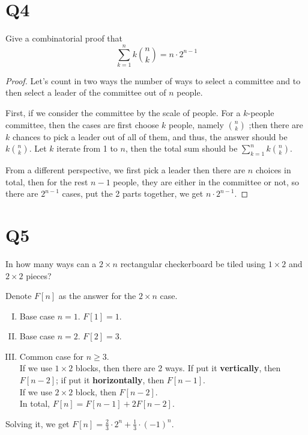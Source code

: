 \documentclass[11pt]{article}
\begin{document}
\section*{Q4}
Give a combinatorial proof that
\begin{equation*}
  \sum_{k=1}^{n }k\binom{n }{k}=n\cdot 2^{n-1}
\end{equation*}
\begin{proof}
    Let's count in two ways the number of ways to select a
committee and to then select a leader of the committee out of $n$ people.

First, if we consider the committee by the scale of people. For a $k$-people
committee, then the cases are first choose $k$ people, namely $\binom{n }{k}$
;then there are $k$ chances to pick a leader out of all of them, and thus, 
the answer should be $k\binom{n }{k}$. Let $k$ iterate from 1 to $n$, then the total sum should be $\sum_{k=1}^{n }k\binom{n }{k}$.

From a different perspective, we first pick a leader then there are $n$ choices in total, then for the rest $n-1$ people, they are either in the committee or not, so there are $2^{n-1}$ cases, put the 2 parts together, we get $n\cdot 2^{n-1}$.
\end{proof}

\section*{Q5}
In how many ways can a $2 \times  n$ rectangular checkerboard be
tiled using $1 \times  2$ and $2 \times  2$ pieces?
\begin{solution}
Denote $F[n]$ as the answer for the $2\times n$ case.
\begin{enumerate}[(I)]
    \item Base case $n=1$.
    $F[1]=1$.

    \item Base case $n=2$.
    $F[2]=3$.

    
    \item Common case for $n\ge 3$. \\
    If we use $1\times 2$ blocks, then there are 2 ways. If put it \textbf{vertically}, then $F[n-2]$; if put it \textbf{horizontally}, then $F[n-1]$. \\
    If we use $2\times 2$ block, then $F[n-2]$.\\
    In total, $F[n]=F[n-1]+2F[n-2]$.
\end{enumerate}
Solving it, we get $F[n]=\frac{2}{3}\cdot 2^{n}+\frac{1}{3}\cdot (-1)^{n}$.
\end{solution}
\end{document}
